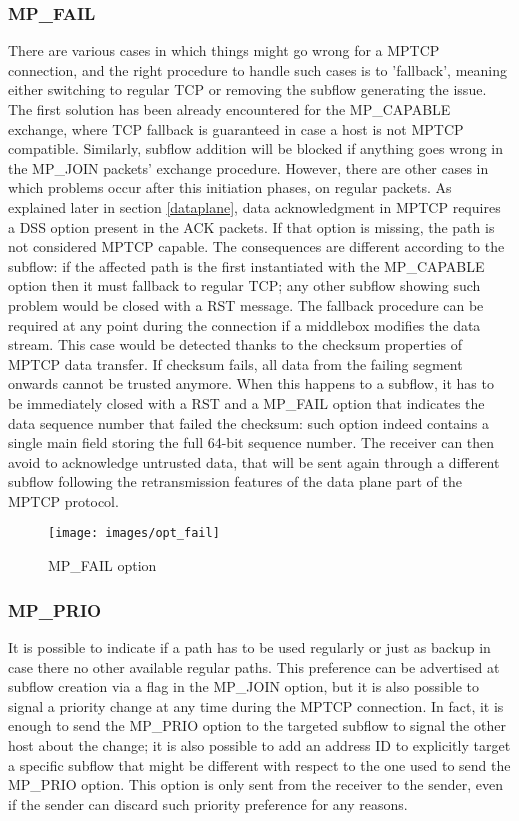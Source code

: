 \subsubsection{MP\_FAIL}
There are various cases in which things might go wrong for a MPTCP connection, and the right procedure to handle such cases is to 'fallback', meaning either switching to regular TCP or removing the subflow generating the issue. The first solution has been already encountered for the MP\_CAPABLE exchange, where TCP fallback is guaranteed in case a host is not MPTCP compatible. Similarly, subflow addition will be blocked if anything goes wrong in the MP\_JOIN packets' exchange procedure. However, there are other cases in which problems occur after this initiation phases, on regular packets. 
As explained later in section \ref{dataplane}, data acknowledgment in MPTCP requires a DSS option present in the ACK packets. If that option is missing, the path is not considered MPTCP capable. The consequences are different according to the subflow: if the affected path is the first instantiated with the MP\_CAPABLE option then it must fallback to regular TCP; any other subflow showing such problem would be closed with a RST message. 
The fallback procedure can be required at any point during the connection if a middlebox modifies the data stream. This case would be detected thanks to the checksum properties of MPTCP data transfer. If checksum fails, all data from the failing segment onwards cannot be trusted anymore. When this happens to a subflow, it has to be immediately closed with a RST and a MP\_FAIL option that indicates the data sequence number that failed the checksum: such option indeed contains a single main field storing the full 64-bit sequence number. The receiver can then avoid to acknowledge untrusted data, that will be sent again through a different subflow following the retransmission features of the data plane part of the MPTCP protocol. 

\begin{figure}[!htb]
\centering
\texttt{[image: images/opt\_fail]}
\caption{MP\_FAIL option}
\label{fig:opt_fail}
\end{figure}

\subsubsection{MP\_PRIO}
It is possible to indicate if a path has to be used regularly or just as backup in case there no other available regular paths. This preference can be advertised at subflow creation via a flag in the MP\_JOIN option, but it is also possible to signal a priority change at any time during the MPTCP connection. In fact, it is enough to send the MP\_PRIO option to the targeted subflow to signal the other host about the change; it is also possible to add an address ID to explicitly target a specific subflow that might be different with respect to the one used to send the MP\_PRIO option. This option is only sent from the receiver to the sender, even if the sender can discard such priority preference for any reasons. 


